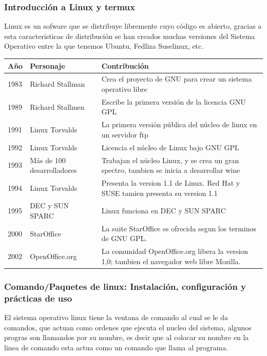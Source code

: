 \documentclass[a4paper,12pt,spanish]{article}
\begin{document}
\newpage
\restoregeometry

\subsubsection{Introducción a Linux y termux}
\label{sec:introduccion-linux-y}

Linux es un sofware que se distribuye libremente cuyo código es abierto, gracias a esta caracteristicas de distribución se han creados muchas versiones del Sistema Operativo entre la que tenemos Ubuntu, Fedliza Suselinux, etc.\\ 

\begin{tabular}[H]{|l|lm{8cm}|}
  \hline
  Año & Personaje & Contribución \\ \hline \hline
                    
  1983 & Richard Stallman & Crea el proyecto de GNU para crear un sistema operativo libre \\
  1989 & Richard Stallmen & Escribe la primera versión de la licencia GNU GPL \\
  1991 & Linux Torvalds &  La primera versión pública del núcleo de linux en un servidor ftp \\
  1992 & Linux Torvalds & Licencia el núcleo de Linux bajo GNU GPL \\
  1993 &  Más de 100 desarrolladores & Trabajan el núcleo Linux, y se crea un gran spectro, tambien se inicia a desarrollar wine \\
  1994 & Linux Torvalds & Presenta la version 1.1 de Linux. Red Hat y SUSE tamien presenta su version 1.1 \\
  1995 & DEC y SUN SPARC &Linux funciona en DEC y SUN SPARC \\ \hline
  2000 & StarOffice &La suite StarOffice es ofrecida segun los terminos de GNU GPL.\\
  2002 & OpenOffice.org &La comunidad OpenOffice.org libera la version 1,0; tambien el navegador web libre Mozilla. \\ \hline
\end{tabular}
\vfill

\subsubsection{Comando/Paquetes de linux: Instalación, configuración y prácticas de uso}
\label{sec:paquetes-de-linux}

El sistema operativo linux tiene la ventana de comando al cual se le da comandos, que actuan como ordenes que ejecuta el nucleo del sistema, algunos progras son llamandos por su nombre, es decir que al colocar su nombre en la linea de comando esta actua como un comando que llama al programa.\\
\end{document}

